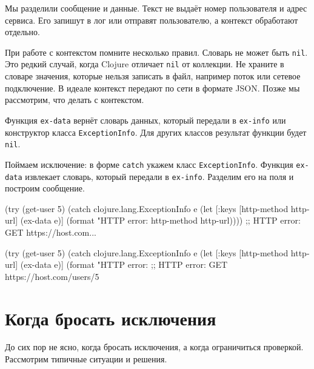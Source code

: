 \fi

Мы разделили сообщение и данные. Текст не выдаёт номер пользователя и адрес
сервиса. Его запишут в лог или отправят пользователю, а контекст обработают
отдельно.

При работе с контекстом помните несколько правил. Словарь не может быть
\verb|nil|. Это редкий случай, когда Clojure отличает \verb|nil| от
коллекции. Не храните в словаре значения, которые нельзя записать в файл,
например поток или сетевое подключение. В идеале контекст передают по сети в
формате JSON. Позже мы рассмотрим, что делать с контекстом.

Функция \verb|ex-data| вернёт словарь данных, который передали в \verb|ex-info|
или конструктор класса \verb|ExceptionInfo|. Для других классов результат
функции будет \verb|nil|.


Поймаем исключение: в форме \verb|catch| укажем класс
\verb|ExceptionInfo|. Функция \verb|ex-data| извлекает словарь, который передали
в \verb|ex-info|. Разделим его на поля и построим сообщение.

\ifx\DEVICETYPE\MOBILE

\begin{english}
  \begin{clojure}
(try
  (get-user 5)
  (catch clojure.lang.ExceptionInfo e
    (let [{:keys [http-method http-url]}
          (ex-data e)]
      (format "HTTP error: %
        http-method http-url))))
;; HTTP error: GET https://host.com...
  \end{clojure}
\end{english}

\else

\begin{english}
  \begin{clojure}
(try
  (get-user 5)
  (catch clojure.lang.ExceptionInfo e
    (let [{:keys [http-method http-url]} (ex-data e)]
      (format "HTTP error: %
;; HTTP error: GET https://host.com/users/5
  \end{clojure}
\end{english}

\fi

\section{Когда бросать исключения}

До сих пор не ясно, когда бросать исключения, а когда ограничиться
проверкой. Рассмотрим типичные ситуации и решения.

